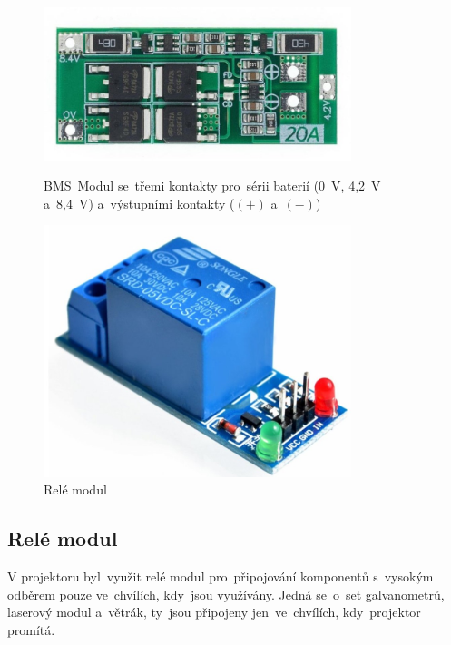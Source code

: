 \begin{figure}[htb]
  \centering
  \begin{minipage}{0.45\textwidth}
    \centering
  \includegraphics[width=0.8\textwidth]{img/BMS.jpg}
  \caption{\label{fig:BMS} BMS~Modul se~třemi kontakty pro~sérii baterií (0~V, 4,2~V a~8,4~V) a~výstupními kontakty ($(+)$ a~$(-)$)~\cite{laskakit-BMS}}
  \end{minipage}\hfill
  \begin{minipage}{0.45\textwidth}
    \centering
  \includegraphics[width=0.8\textwidth]{img/relay.jpg}
  \caption{\label{fig:relay} Relé modul~\cite{laskakit-relay}}
  \end{minipage}
\end{figure}

\subsection{Relé modul}
V projektoru byl~využit relé modul pro~připojování komponentů s~vysokým odběrem pouze ve~chvílích, kdy~jsou využívány. Jedná se~o~set galvanometrů, laserový modul a~větrák, ty~jsou připojeny jen~ve~chvílích, kdy~projektor promítá.

